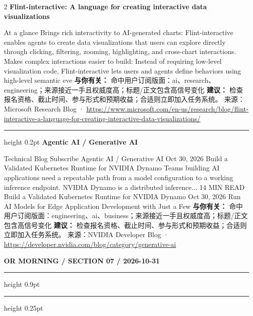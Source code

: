 \documentclass[10.5pt]{ctexart}
\begin{document}
\begin{multicols}{2}
{\large\bfseries Flint-interactive: A language for creating interactive data visualizations}\par
At a glance Brings rich interactivity to AI-generated charts: Flint-interactive enables agents to create data visualizations that users can explore directly through clicking, filtering, zooming, highlighting, and cross-chart interactions. Makes complex interactions easier to build: Instead of requiring low-level visualization code, Flint-interactive lets users and agents define behaviors using high-level semantic eve
\textbf{与你有关：} 命中用户订阅版面：ai、research、engineering；来源接近一手且权威度高；标题/正文包含高信号变化
\textbf{建议：} 检查报名资格、截止时间、参与形式和预期收益；合适则立即加入任务系统。
{\footnotesize\color{ormuted} 来源：Microsoft Research Blog · \url{https://www.microsoft.com/en-us/research/blog/flint-interactive-a-language-for-creating-interactive-data-visualizations/}}
\vspace{2mm}
\hrule height 0.2pt
\vspace{2mm}
{\large\bfseries Agentic AI / Generative AI}\par
Technical Blog Subscribe Agentic AI / Generative AI Oct 30, 2026 Build a Validated Kubernetes Runtime for NVIDIA Dynamo Teams building AI applications need a repeatable path from a model configuration to a working inference endpoint. NVIDIA Dynamo is a distributed inference... 14 MIN READ Build a Validated Kubernetes Runtime for NVIDIA Dynamo Oct 30, 2026 Run AI Models for Edge Application Development with Just a Few
\textbf{与你有关：} 命中用户订阅版面：engineering、ai、business；来源接近一手且权威度高；标题/正文包含高信号变化
\textbf{建议：} 检查报名资格、截止时间、参与形式和预期收益；合适则立即加入任务系统。
{\footnotesize\color{ormuted} 来源：NVIDIA Developer Blog · \url{https://developer.nvidia.com/blog/category/generative-ai}}
\end{multicols}
\newpage
{\small\bfseries OR MORNING / SECTION 07 / 2026-10-31}
\vspace{2mm}
\hrule height 0.9pt
\vspace{1.5mm}
\hrule height 0.25pt
\vspace{4mm}
\end{document}
